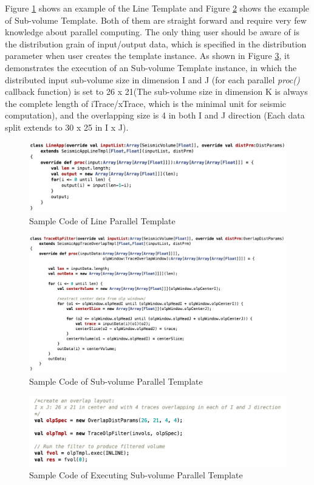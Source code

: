 Figure \ref{code_tmpl_line} shows an example of the Line Template and Figure \ref{code_tmpl_subv} shows the example of Sub-volume Template. Both of them are straight forward and require very few knowledge about parallel computing. The only thing user should be aware of is the distribution grain of input/output data, which is specified in the distribution parameter when user creates the template instance. As shown in Figure \ref{code_run_subv}, it demonstrates the execution of an Sub-volume Template instance, in which the distributed input sub-volume size in dimension I and J (for each parallel \emph{proc()} callback function) is set to 26 x 21(The sub-volume size in dimension K is always the complete length of iTrace/xTrace, which is the minimal unit for seismic computation), and the overlapping size is 4 in both I and J direction (Each data split extends to 30 x 25 in I x J).

\begin{figure}[h]
\centering
\includegraphics[scale=0.6]{figures/code_tmpl_line.png}
\caption{Sample Code of Line Parallel Template}
\label{code_tmpl_line}
\end{figure}

\begin{figure}[h]
\centering
\includegraphics[scale=0.5]{figures/code_tmpl_subv.png}
\caption{Sample Code of Sub-volume Parallel Template}
\label{code_tmpl_subv}
\end{figure}

\begin{figure}[h]
\centering
\includegraphics[scale=0.6]{figures/code_run_subv.png}
\caption{Sample Code of Executing Sub-volume Parallel Template}
\label{code_run_subv}
\end{figure}


